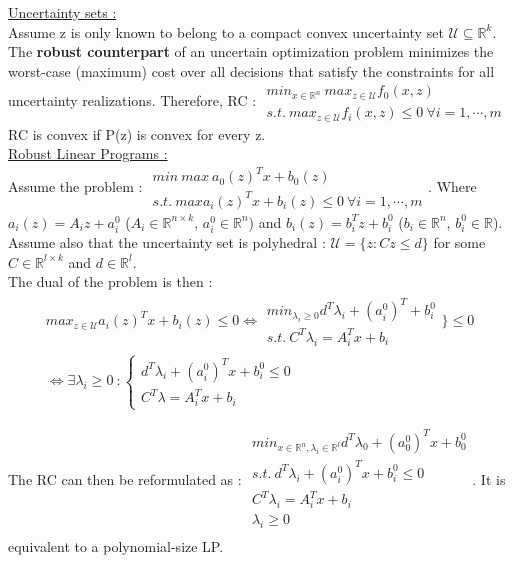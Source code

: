 \documentclass[../main.tex]{subfiles}
\begin{document}
\quad \underline{Uncertainty sets :}\\
Assume z is only known to belong to a compact convex uncertainty set $\mathcal{U}\subseteq \mathbb{R}^k$. The \textbf{robust counterpart} of an uncertain optimization problem minimizes the worst-case (maximum) cost over all decisions that satisfy the constraints for all uncertainty realizations. Therefore, RC : $\begin{matrix}
    min_{x\in \mathbb{R}^n} \: max_{z\in \mathcal{U}} f_0(x,z)\\
    s.t. \: max_{z\in \mathcal{U}} f_i(x,z) \leq 0 \: \forall i=1,\cdots, m
\end{matrix}$
RC is convex if P(z) is convex for every z. \\

\quad \underline{Robust Linear Programs :}\\
Assume the problem : $\begin{matrix}
    min\: max\: a_0 (z)^T x + b_0(z)\\
    s.t. \: max a_i(z)^T x + b_i(z) \leq 0 \: \forall i=1,\cdots, m
\end{matrix}$. Where $a_i(z) = A_i z + a_i^0$ ($A_i \in \mathbb{R}^{n\times k}$, $a_i^0 \in \mathbb{R}^n$) and $b_i(z) = b_i^T z + b_i^0$ ($b_i \in \mathbb{R}^n$, $b_i^0 \in \mathbb{R}$). Assume also that the uncertainty set is polyhedral : $\mathcal{U} = \{z: Cz\leq d\}$ for some $C\in \mathbb{R}^{l\times k}$ and $d\in \mathbb{R}^l$.\\
The dual of the problem is then : \begin{equation}
    \begin{gathered}
        max_{z\in \mathcal{U}} a_i(z)^T x + b_i(z) \leq 0 \Leftrightarrow \begin{matrix}
            min_{\lambda_i \geq 0} d^T \lambda_i + (a_i^0)^T + b_i^0\\
            s.t. \: C^T \lambda_i = A_i^Tx + b_i
        \end{matrix}\Biggr\} \leq 0\\
        \Leftrightarrow \exists \lambda_i \geq 0 \: : \begin{cases}
            d^T \lambda_i + (a_i^0)^Tx + b_i^0 \leq 0\\
            C^T \lambda = A_i^T x + b_i
        \end{cases}
    \end{gathered}
\end{equation}

The RC can then be reformulated as : $\begin{matrix}min_{x\in \mathbb{R}^n, \lambda_i\in \mathbb{R}^l}d^T \lambda_0 + (a_0^0)^Tx+ b_0^0\\
s.t. \: d^T \lambda_i + (a_i^0)^Tx + b_i^0 \leq 0\\
C^T \lambda_i = A_i^Tx + b_i\\
\lambda_i \geq 0\\
\end{matrix}$. It is equivalent to a polynomial-size LP.\\
\end{document}
